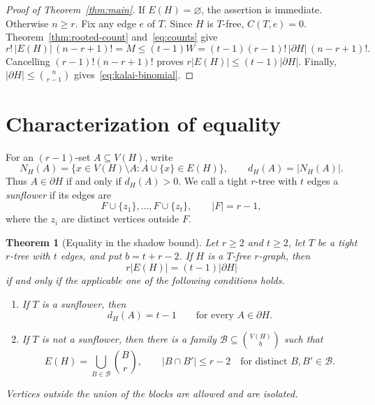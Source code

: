 \documentclass[11pt]{article}
\newtheorem{theorem}{Theorem}[section]
\theoremstyle{remark}
\numberwithin{equation}{section}
\newcommand{\sh}{\partial}
\begin{document}
	\begin{proof}[Proof of Theorem~\ref{thm:main}]
		If $E(H)=\varnothing$, the assertion is immediate. Otherwise
		$n\ge r$. Fix any edge $e$ of $T$. Since $H$ is $T$-free,
		$C(T,e)=0$. Theorem~\ref{thm:rooted-count} and~\eqref{eq:counts}
		give
		\[
		r!\,|E(H)|\,(n-r+1)! = M \le (t-1)W 
		= (t-1)(r-1)!\,|\sh H|\,(n-r+1)!.
		\]
		Cancelling $(r-1)!(n-r+1)!$ proves
		$r|E(H)|\le(t-1)|\sh H|$. Finally,
		$|\sh H|\le\binom{n}{r-1}$ gives~\eqref{eq:kalai-binomial}.
	\end{proof}
	
	\iffalse
	
	\section{Characterization of equality}\label{sec:equality}
	
	For an $(r-1)$-set $A\subseteq V(H)$, write
	\[
	N_H(A)=\{x\in V(H)\setminus A:A\cup\{x\}\in E(H)\},
	\qquad d_H(A)=|N_H(A)|.
	\]
	Thus $A\in\sh H$ if and only if $d_H(A)>0$. We call a tight
	$r$-tree with $t$ edges a \emph{sunflower} if its edges are
	\[
	F\cup\{z_1\},\ldots,F\cup\{z_t\},
	\qquad |F|=r-1,
	\]
	where the $z_i$ are distinct vertices outside $F$.
	
	\begin{theorem}[Equality in the shadow bound]\label{thm:equality-shadow}
		Let $r\ge2$ and $t\ge2$, let $T$ be a tight $r$-tree with $t$
		edges, and put $b=t+r-2$. If $H$ is a $T$-free $r$-graph, then
		\begin{equation}\label{eq:equality-shadow}
			r|E(H)|=(t-1)|\sh H|
		\end{equation}
		if and only if the applicable one of the following conditions holds.
		\begin{enumerate}[label=\textup{(\roman*)},leftmargin=*]
			\item If $T$ is a sunflower, then
			\[
			d_H(A)=t-1\qquad\text{for every }A\in\sh H.
			\]
			\item If $T$ is not a sunflower, then there is a family
			$\mathcal B\subseteq\binom{V(H)}b$ such that
			\begin{equation}\label{eq:equality-blocks}
				E(H)=\bigcup_{B\in\mathcal B}\binom Br,
				\qquad |B\cap B'|\le r-2
				\quad\text{for distinct }B,B'\in\mathcal B.
			\end{equation}
		\end{enumerate}
		Vertices outside the union of the blocks are allowed and are isolated.
	\end{theorem}
	
\end{document}
